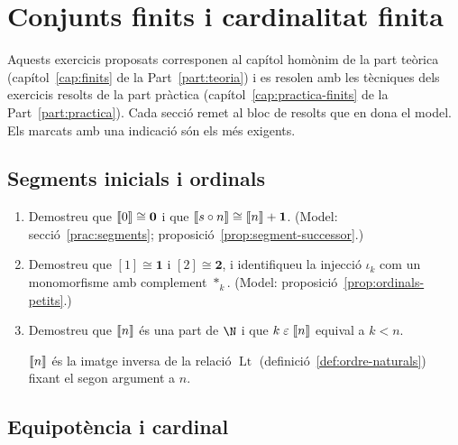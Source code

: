 \chapter{Conjunts finits i cardinalitat finita}\label{cap:exercicis-finits}

Aquests exercicis proposats corresponen al capítol homònim de la part teòrica (capítol~\ref{cap:finits} de la Part~\ref{part:teoria}) i es resolen amb les tècniques dels exercicis resolts de la part pràctica (capítol~\ref{cap:practica-finits} de la Part~\ref{part:practica}). Cada secció remet al bloc de resolts que en dona el model. Els marcats amb una indicació són els més exigents.

\section{Segments inicials i ordinals}

\begin{enumerate}
  \item Demostreu que \(\llbracket 0\rrbracket\cong\mathbf0\) i que \(\llbracket s\circ n\rrbracket\cong\llbracket n\rrbracket+\mathbf1\). (Model: secció~\ref{prac:segments}; proposició~\ref{prop:segment-successor}.)

  \item Demostreu que \([1]\cong\mathbf1\) i \([2]\cong\mathbf2\), i identifiqueu la injecció \(\iota_k\) com un monomorfisme amb complement \(\ast_k\). (Model: proposició~\ref{prop:ordinals-petits}.)

  \item Demostreu que \(\llbracket n\rrbracket\) és una part de \(\N\) i que \(k\mathrel{\varepsilon}\llbracket n\rrbracket\) equival a \(k<n\). \begin{indicacio}\(\llbracket n\rrbracket\) és la imatge inversa de la relació \(\operatorname{Lt}\) (definició~\ref{def:ordre-naturals}) fixant el segon argument a \(n\).\end{indicacio}
\end{enumerate}

\section{Equipotència i cardinal}

